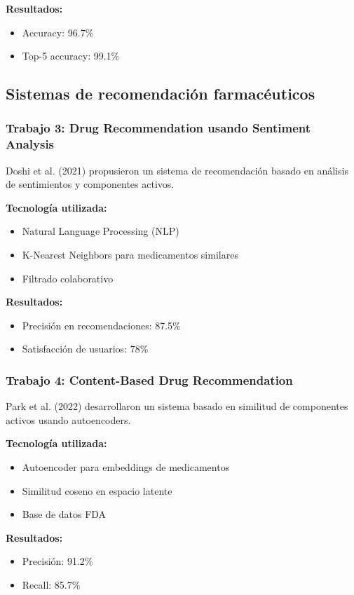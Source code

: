 \textbf{Resultados:}
\begin{itemize}
	\item Accuracy: 96.7\%
	\item Top-5 accuracy: 99.1\%
\end{itemize}

\subsection{Sistemas de recomendación farmacéuticos}

\subsubsection{Trabajo 3: Drug Recommendation usando Sentiment Analysis}

Doshi et al. (2021) propusieron un sistema de recomendación basado en análisis de sentimientos y componentes activos.

\textbf{Tecnología utilizada:}
\begin{itemize}
	\item Natural Language Processing (NLP)
	\item K-Nearest Neighbors para medicamentos similares
	\item Filtrado colaborativo
\end{itemize}

\textbf{Resultados:}
\begin{itemize}
	\item Precisión en recomendaciones: 87.5\%
	\item Satisfacción de usuarios: 78\%
\end{itemize}

\subsubsection{Trabajo 4: Content-Based Drug Recommendation}

Park et al. (2022) desarrollaron un sistema basado en similitud de componentes activos usando autoencoders.

\textbf{Tecnología utilizada:}
\begin{itemize}
	\item Autoencoder para embeddings de medicamentos
	\item Similitud coseno en espacio latente
	\item Base de datos FDA
\end{itemize}

\textbf{Resultados:}
\begin{itemize}
	\item Precisión: 91.2\%
	\item Recall: 85.7\%
\end{itemize}

